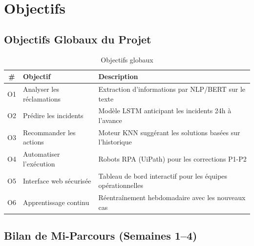 \documentclass[12pt,a4paper]{report}
\begin{document}
\chapter{Objectifs}

\section{Objectifs Globaux du Projet}

\begin{table}[H]
\centering
\caption{Objectifs globaux}
\begin{tabularx}{\textwidth}{|c|l|X|}
\hline
\textbf{\#} & \textbf{Objectif} & \textbf{Description} \\
\hline
O1 & Analyser les réclamations & Extraction d'informations par NLP/BERT sur le texte \\
\hline
O2 & Prédire les incidents & Modèle LSTM anticipant les incidents 24h à l'avance \\
\hline
O3 & Recommander les actions & Moteur KNN suggérant les solutions basées sur l'historique \\
\hline
O4 & Automatiser l'exécution & Robots RPA (UiPath) pour les corrections P1-P2 \\
\hline
O5 & Interface web sécurisée & Tableau de bord interactif pour les équipes opérationnelles \\
\hline
O6 & Apprentissage continu & Réentraînement hebdomadaire avec les nouveaux cas \\
\hline
\end{tabularx}
\end{table}

\section{Bilan de Mi-Parcours (Semaines 1--4)}
\end{document}
